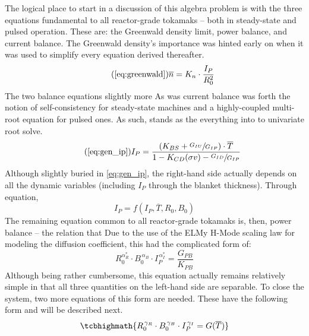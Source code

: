 The logical place to start in a discussion of this algebra problem is with the three equations fundamental to all reactor-grade tokamaks -- both in steady-state and pulsed operation. These are: the Greenwald density limit, power balance, and current balance. The Greenwald density's importance was hinted early on when it was used to simplify every equation derived thereafter.
\begin{equation}
	\tag{\ref{eq:greenwald}}
	\overline n = K_n \cdot \frac{I_P}{R_0^2}
\end{equation}
The two balance equations  slightly more  As was  current balance  was  forth the notion of self-consistency for steady-state machines and a highly-coupled multi-root equation for pulsed ones. As such,  stands as the  everything  into to  univariate root solve.
\begin{equation}
	\tag{\ref{eq:gen_ip}}
	I_P = \frac{ \left( K_{BS} + \sfrac{ G_{IU} }{ G_{IP} } \right) \cdot \overline T }{ 1 - K_{CD} ( \sigma v ) - \sfrac{ G_{ID} }{ G_{IP} } }
\end{equation}
Although slightly buried in \cref{eq:gen_ip}, the right-hand side actually depends on all the dynamic variables (including $I_P$ through the  blanket thickness). Through equation,
\begin{equation}
	I_P = f(I_P, \overline T, R_0, B_0)
\end{equation}
The remaining equation common to all reactor-grade tokamaks is, then, power balance -- the relation that  Due to the use of the ELMy H-Mode scaling law for modeling the diffusion coefficient, this had the complicated form of:
\begin{equation}
	\label{eq:freidberg}
	R_0^{ \alpha_R^* } \cdot B_0^{\,\alpha_B} \cdot I_P^{\,\alpha_I^*} = \frac{ G_{PB} }{ K_{PB} }
\end{equation}
Although being rather cumbersome, this equation actually remains relatively simple in that all three quantities on the left-hand side are separable. To close the system, two more equations of this form are needed. These have the following form and will be described next.
\begin{equation}
	\label{eq:rbi}
	\tcbhighmath{
	R_0^{\, \gamma_R} \cdot B_0^{\, \gamma_B} \cdot I_P^{\, \gamma_I} = G( \overline T )
	}
\end{equation}

